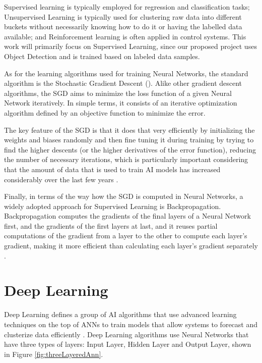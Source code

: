 Supervised learning is typically employed for regression and classification tasks; 
Unsupervised Learning is typically used for clustering raw data into different buckets
without necessarily knowing how to do it or having the labelled data available;
and Reinforcement learning is often applied in control systems.
This work will primarily focus on Supervised Learning, since our proposed project uses
Object Detection and is trained based on labeled data samples.

As for the learning algorithms used for training Neural Networks, 
the standard algorithm is the Stochastic Gradient Descent ().
Alike other gradient descent algorithms, the SGD aims to minimize the loss function of a given
Neural Network iteratively. In simple terms, it consists of an iterative optimization algorithm defined by an
objective function to minimize the error.

The key feature of the SGD is that it does that very efficiently by initializing the weights
and biases randomly and then fine tuning it during training by trying to find the higher descents 
(or the higher derivatives of the error function), reducing the number of necessary iterations, 
which is particularly important considering that the amount of data that is used to train AI
models has increased considerably over the last few years \cite{CornellSGD}.

Finally, in terms of the way how the SGD is computed in Neural Networks, a widely adopted approach 
for Supervised Learning is Backpropagation. Backpropagation computes the gradients of the final 
layers of a Neural Network first, and the gradients of the first layers at last, 
and it reuses partial computations of the gradient from a layer to the other to compute each layer's 
gradient, making it more efficient than calculating each layer's gradient separately \cite{BrilliantBackpropagation}. 

\section{Deep Learning}

Deep Learning defines a group of AI algorithms that use advanced learning techniques on the 
top of ANNs to train models that allow systems to forecast and clusterize data 
efficiently \cite{IBMDeepLearning}.
Deep Learning algorithms use Neural Networks that have three types of layers:
Input Layer, Hidden Layer and Output Layer, shown in Figure \ref{fig:threeLayeredAnn}.
        
